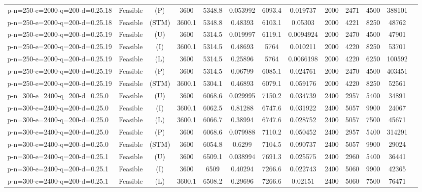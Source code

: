 \documentclass[landscape, a4paper]{article}
\newcommand{\STM}{\ensuremath{\mathrm{STM}}}
\newcommand{\Improved}{\ensuremath{\mathrm{I}}}
\newcommand{\Loose}{\ensuremath{\mathrm{L}}}
\newcommand{\Profit}{\ensuremath{\mathrm{P}}}
\newcommand{\Utility}{\ensuremath{\mathrm{U}}}
\begin{document}
\begin{center}
\begin{tabular}{lcccccccccccc}
p-n=250-e=2000-q=200-d=0.25.18 & Feasible & (\Profit) & 3600 & 5348.8 & 0.053992 & 6093.4 & 0.019737 & 2000 & 2471 & 4500 & 388101 & \\
p-n=250-e=2000-q=200-d=0.25.18 & Feasible & (\STM) & 3600.1 & 5348.8 & 0.48393 & 6103.1 & 0.05303 & 2000 & 4221 & 8250 & 48762 & \\
p-n=250-e=2000-q=200-d=0.25.19 & Feasible & (\Utility) & 3600 & 5314.5 & 0.019997 & 6119.1 & 0.0094924 & 2000 & 2470 & 4500 & 47901 & \\
p-n=250-e=2000-q=200-d=0.25.19 & Feasible & (\Improved) & 3600.1 & 5314.5 & 0.48693 & 5764 & 0.010211 & 2000 & 4220 & 8250 & 53701 & \\
p-n=250-e=2000-q=200-d=0.25.19 & Feasible & (\Loose) & 3600 & 5314.5 & 0.25896 & 5764 & 0.0066198 & 2000 & 4220 & 6250 & 100592 & \\
p-n=250-e=2000-q=200-d=0.25.19 & Feasible & (\Profit) & 3600 & 5314.5 & 0.06799 & 6085.1 & 0.024761 & 2000 & 2470 & 4500 & 403451 & \\
p-n=250-e=2000-q=200-d=0.25.19 & Feasible & (\STM) & 3600.1 & 5304.1 & 0.46893 & 6079.1 & 0.059176 & 2000 & 4220 & 8250 & 52561 & \\
p-n=300-e=2400-q=200-d=0.25.0 & Feasible & (\Utility) & 3600 & 6068.6 & 0.029995 & 7150.2 & 0.034739 & 2400 & 2957 & 5400 & 34891 & \\
p-n=300-e=2400-q=200-d=0.25.0 & Feasible & (\Improved) & 3600.1 & 6062.5 & 0.81288 & 6747.6 & 0.031922 & 2400 & 5057 & 9900 & 24067 & \\
p-n=300-e=2400-q=200-d=0.25.0 & Feasible & (\Loose) & 3600.1 & 6066.7 & 0.38994 & 6747.6 & 0.028752 & 2400 & 5057 & 7500 & 45671 & \\
p-n=300-e=2400-q=200-d=0.25.0 & Feasible & (\Profit) & 3600 & 6068.6 & 0.079988 & 7110.2 & 0.050452 & 2400 & 2957 & 5400 & 314291 & \\
p-n=300-e=2400-q=200-d=0.25.0 & Feasible & (\STM) & 3600 & 6054.8 & 0.6299 & 7104.5 & 0.090737 & 2400 & 5057 & 9900 & 29024 & \\
p-n=300-e=2400-q=200-d=0.25.1 & Feasible & (\Utility) & 3600 & 6509.1 & 0.038994 & 7691.3 & 0.025575 & 2400 & 2960 & 5400 & 36441 & \\
p-n=300-e=2400-q=200-d=0.25.1 & Feasible & (\Improved) & 3600 & 6509 & 0.40294 & 7266.6 & 0.022743 & 2400 & 5060 & 9900 & 42365 & \\
p-n=300-e=2400-q=200-d=0.25.1 & Feasible & (\Loose) & 3600.1 & 6508.2 & 0.29696 & 7266.6 & 0.02151 & 2400 & 5060 & 7500 & 76471 & \\

\end{tabular}
\end{center}
\end{document}
